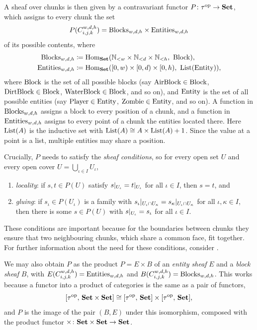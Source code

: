 A sheaf over chunks is then given by a contravariant functor
$P \colon \tau^{\mathrm{op}} \to \mathbf{Set}$, which assigns to every chunk the set
\[
	P(C_{i,j,k}^{w,d,h}) = \mathrm{Blocks}_{w,d,h} \times \mathrm{Entities}_{w,d,h}
\]
of its possible contents, where
\begin{align*}
	\mathrm{Blocks}_{w,d,h}   & \coloneqq \text{Hom}_{\mathbf{Set}}(\mathbb{N}_{<w} \times \mathbb{N}_{<d} \times \mathbb{N}_{<h},\ \mathrm{Block}), \\
	\mathrm{Entities}_{w,d,h} & \coloneqq \text{Hom}_{\mathbf{Set}}([0,w) \times [0,d) \times [0,h),\ \mathrm{List}(\mathrm{Entity})),
\end{align*}
where $\mathrm{Block}$ is the set of all possible blocks (say
$\mathrm{AirBlock} \in \mathrm{Block}$, $\mathrm{DirtBlock} \in \mathrm{Block}$,
$\mathrm{WaterBlock} \in \mathrm{Block}$, and so on), and $\mathrm{Entity}$ is the set of all
possible entities (say $\mathrm{Player} \in \mathrm{Entity}$,
$\mathrm{Zombie} \in \mathrm{Entity}$, and so on). A function in $\mathrm{Blocks}_{w,d,h}$
assigns a block to every position of a chunk, and a function in
$\mathrm{Entities}_{w,d,h}$ assigns to every point of a chunk the entities located
there. Here $\mathrm{List}(A)$ is the inductive set with
$\mathrm{List}(A) \cong A \times \mathrm{List}(A) + 1$. Since the value at a point is a list,
multiple entities may share a position.

Crucially, $P$ needs to satisfy the \emph{sheaf conditions}, so for every open
set $U$ and every open cover $U = \bigcup_{\iota \in I} U_\iota$,
\begin{enumerate}[label=(\roman*)]
	\item \emph{locality}: if $s, t \in P(U)$ satisfy
	      $s|_{U_\iota} = t|_{U_\iota}$ for all $\iota \in I$, then
	      $s = t$, and
	\item \emph{gluing}: if $s_\iota \in P(U_\iota)$ is a family with
	      $s_\iota|_{U_\iota \cap U_\kappa} = s_\kappa|_{U_\iota \cap U_\kappa}$
	      for all $\iota, \kappa \in I$, then there is some $s \in P(U)$ with
	      $s|_{U_\iota} = s_\iota$ for all $\iota \in I$.
\end{enumerate}
These conditions are important because for the boundaries between chunks they
ensure that two neighbouring chunks, which share a common face, fit together.
For further information about the need for these conditions, consider
\cite{happelSheavesMinecraft2021}.

We may also obtain $P$ as the product $P = E \times B$ of an \emph{entity
	sheaf} $E$ and a \emph{block sheaf} $B$, with $E(C_{i,j,k}^{w,d,h}) = \mathrm{Entities}_{w,d,h}$
and $B(C_{i,j,k}^{w,d,h}) = \mathrm{Blocks}_{w,d,h}$. This works because a functor into a product
of categories is the same as a pair of functors,
\[
	[\tau^{\mathrm{op}},\, \mathbf{Set} \times \mathbf{Set}]
	\cong [\tau^{\mathrm{op}},\, \mathbf{Set}] \times [\tau^{\mathrm{op}},\, \mathbf{Set}],
\]
and $P$ is the image of the pair $(B, E)$ under this isomorphism, composed with
the product functor ${\times} \colon \mathbf{Set} \times \mathbf{Set} \to \mathbf{Set}$.

